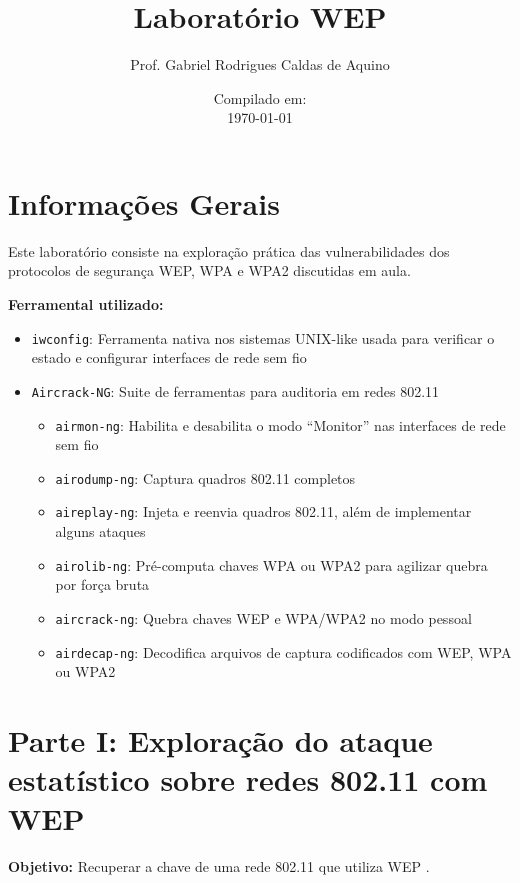 \title{Laboratório WEP}
\author{Prof. Gabriel Rodrigues Caldas de Aquino}
\date{Compilado em: \\ \today}



\maketitle
\section*{Informações Gerais}

Este laboratório consiste na exploração prática das vulnerabilidades dos protocolos de segurança WEP, WPA e WPA2 discutidas em aula.

\textbf{Ferramental utilizado:}
\begin{itemize}
    \item \texttt{iwconfig}: Ferramenta nativa nos sistemas UNIX-like usada para verificar o estado e configurar interfaces de rede sem fio
    \item \texttt{Aircrack-NG}: Suite de ferramentas para auditoria em redes 802.11
    \begin{itemize}
        \item \texttt{airmon-ng}: Habilita e desabilita o modo “Monitor” nas interfaces de rede sem fio
        \item \texttt{airodump-ng}: Captura quadros 802.11 completos
        \item \texttt{aireplay-ng}: Injeta e reenvia quadros 802.11, além de implementar alguns ataques
        \item \texttt{airolib-ng}: Pré-computa chaves WPA ou WPA2 para agilizar quebra por força bruta
        \item \texttt{aircrack-ng}: Quebra chaves WEP e WPA/WPA2 no modo pessoal
        \item \texttt{airdecap-ng}: Decodifica arquivos de captura codificados com WEP, WPA ou WPA2
    \end{itemize}
\end{itemize}

\section*{Parte I: Exploração do ataque estatístico sobre redes 802.11 com WEP}

\textbf{Objetivo:} Recuperar a chave de uma rede 802.11 que utiliza WEP \cite{vibhuti2005ieee}.  

